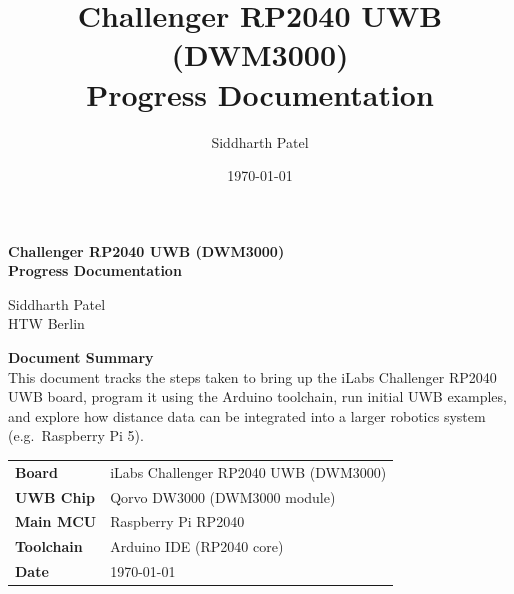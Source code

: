 \documentclass[a4paper,11pt]{article}
\title{\vspace{-1.5cm}\bfseries\Huge Challenger RP2040 UWB (DWM3000)\\[0.4em]
	\Large Progress Documentation}
\author{\large Siddharth Patel}
\date{\today}
\begin{document}
	
	\begin{titlepage}
		\color{textgray}
		\vspace*{1cm}
		
		\begin{tcolorbox}[colback=accent, height=0.4cm, boxrule=0pt, enlarge left by=-1.8cm, enlarge right by=-1.8cm]
		\end{tcolorbox}
		
		\vspace{1.5cm}
		
		{\Huge\bfseries Challenger RP2040 UWB (DWM3000)\\[0.5em]
			\LARGE Progress Documentation}
		
		\vspace{1.2cm}
		
		{\Large Siddharth Patel}\\[0.4cm]
		{\large HTW Berlin}
		
		\vspace{1.8cm}
		
		\begin{tcolorbox}[
			colback=accentlight,
			boxrule=0pt,
			enlarge left by=0cm,
			enlarge right by=0cm,
			left=8pt, right=8pt, top=8pt, bottom=8pt
			]
			\textbf{Document Summary}\\[0.4em]
			This document tracks the steps taken to bring up the iLabs Challenger RP2040 UWB board,
			program it using the Arduino toolchain, run initial UWB examples, and explore how distance
			data can be integrated into a larger robotics system (e.g.\ Raspberry Pi 5).
		\end{tcolorbox}
		
		\vfill
		
		\begin{tabular}{ll}
			\textbf{Board} & iLabs Challenger RP2040 UWB (DWM3000) \\
			\textbf{UWB Chip} & Qorvo DW3000 (DWM3000 module) \\
			\textbf{Main MCU} & Raspberry Pi RP2040 \\
			\textbf{Toolchain} & Arduino IDE (RP2040 core) \\
			\textbf{Date} & \today \\
		\end{tabular}
		
		\vspace{1cm}
		
		\begin{tcolorbox}[colback=accent, height=0.25cm, boxrule=0pt, enlarge left by=-1.8cm, enlarge right by=-1.8cm]
		\end{tcolorbox}
	\end{titlepage}
	
\end{document}
